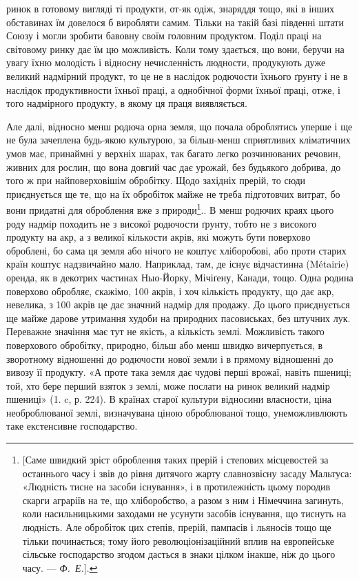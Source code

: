 \parcont{}  %
ринок в готовому вигляді ті продукти, от-як одіж, знаряддя тощо, які в інших
обставинах їм довелося б виробляти самим. Тільки на такій базі південні штати
Союзу і могли зробити бавовну своїм головним продуктом. Поділ праці на світовому
ринку дає їм цю можливість. Коли тому здається, що вони, беручи
на увагу їхню молодість і відносну нечисленність людности, продукують дуже
великий надмірний продукт, то це не в наслідок родючости їхнього ґрунту і не
в наслідок продуктивности їхньої праці, а однобічної форми їхньої праці, отже,
і того надмірного продукту, в якому ця праця виявляється.

Але далі, відносно менш родюча орна земля, що почала оброблятись уперше
і ще не була зачеплена будь-якою культурою, за більш-менш сприятливих
кліматичних умов має, принаймні у верхніх шарах, так багато легко розчинюваних
речовин, живних для рослин, що вона довгий час дає урожай, без будьякого
добрива, до того ж при найповерховішім обробітку. Щодо західніх прерій,
то сюди приєднується ще те, що на їх обробіток майже не треба підготовчих
витрат, бо вони придатні для оброблення вже з природи\footnote{
[Саме швидкий зріст оброблення таких прерій і степових місцевостей за останнього часу і звів до
рівня дитячого жарту славнозвісну засаду Мальтуса: «Людність тисне на засоби існування», і в
протилежність цьому породив скарги аграріїв на те, що хліборобство, а разом з ним і Німеччина
загинуть, коли насильницькими заходами не усунути засобів існування, що тиснуть на людність. Але
обробіток цих степів, прерій, пампасів і льяносів тощо ще тільки починається; тому його
революціонізаційний вплив на европейське сільське господарство згодом дасться в знаки цілком інакше,
ніж до цього часу. — \emph{Ф.~Е.}].
}.. В менш родючих
краях цього роду надмір походить не з високої родючости ґрунту, тобто не з
високого продукту на акр, а з великої кількости акрів, які можуть бути поверхово
оброблені, бо сама ця земля або нічого не коштує хліборобові, або проти
старих країн коштує надзвичайно мало. Наприклад, там, де існує відчастинна
(Métairie) оренда, як в декотрих частинах Ныо-Йорку, Мічіґену, Канади, тощо.
Одна родина поверхово обробляє, скажімо, 100 акрів, і хоч кількість продукту,
що дає акр, невелика, з 100 акрів це дає значний надмір для продажу. До
цього приєднується ще майже дарове утримання худоби на природних пасовиськах,
без штучних лук. Переважне значіння має тут не якість, а кількість землі.
Можливість такого поверхового обробітку, природно, більш або менш швидко
вичерпується, в зворотному відношенні до родючости нової земли і в прямому відношенні до вивозу її
продукту. «А проте така земля дає чудові перші врожаї, навіть
пшениці; той, хто бере перший взяток з землі, може послати на ринок великий
надмір пшениці» (1. c, р. 224). В країнах старої культури відносини власности,
ціна необроблюваної землі, визначувана ціною оброблюваної тощо, унеможливлюють
таке екстенсивне господарство.

